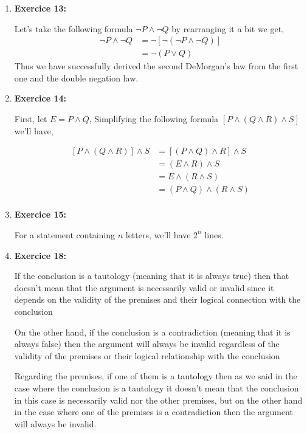 \documentclass{article} %
\begin{document}
\begin{enumerate}
\begin{itemize}
    \end{itemize}

    \item \textbf{Exercice 13:}

    Let's take the following formula $\neg P \land \neg Q$ by rearranging it a bit we get,
    \begin{equation*}
        \begin{split}
            \neg P \land \neg Q & = \neg [\neg (\neg P \land \neg Q)] \\
            & = \neg (P \lor Q)
        \end{split}
    \end{equation*}
    Thus we have successfully derived the second DeMorgan's law from the first one and the double negation law.

    \item \textbf{Exercice 14:}

    First, let $E = P \land Q$, Simplifying the following formula $[P \land (Q \land R) \land S]$ we'll have, 

    \begin{equation*}
        \begin{split}
            [P \land (Q \land R)] \land S & = [(P \land Q) \land R] \land S \\
            & = (E \land R) \land S \\
            & = E \land (R \land S) \\
            & = (P \land Q) \land (R \land S) \\
        \end{split}
    \end{equation*}

    \item \textbf{Exercice 15:}

    For a statement containing $n$ letters, we'll have $2^{n}$ lines.

    \item \textbf{Exercice 18:}

    If the conclusion is a tautology (meaning that it is always true) then that doesn't mean that the argument is necessarily valid or invalid since it depends on the validity of the premises and their logical connection with the conclusion

    On the other hand, if the conclusion is a contradiction (meaning that it is always false) then the argument will always be invalid regardless of the validity of the premises or their logical relationship with the conclusion

    Regarding the premises, if one of them is a tautology then as we said in the case where the conclusion is a tautology it doesn't mean that the conclusion in this case is necessarily valid nor the other premises, but on the other hand in the case where one of the premises is a contradiction then the argument will always be invalid.
    
    \end{enumerate}
\end{document}
